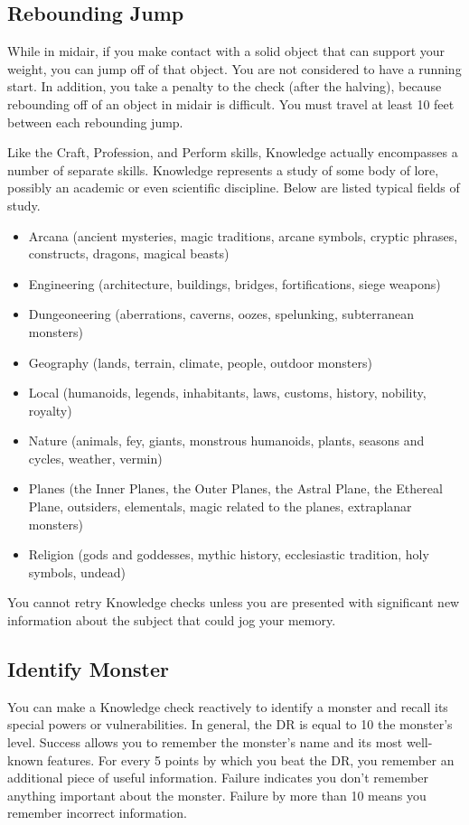     \subsection{Rebounding Jump}\label{Rebounding Jump}
        While in midair, if you make contact with a solid object that can support your weight, you can jump off of that object. You are not considered to have a running start. In addition, you take a  penalty to the check (after the halving), because rebounding off of an object in midair is difficult. You must travel at least 10 feet between each rebounding jump.

        Like the Craft, Profession, and Perform skills, Knowledge actually encompasses a number of separate skills. Knowledge represents a study of some body of lore, possibly an academic or even scientific discipline. Below are listed typical fields of study.
        \begin{itemize}
            \item Arcana (ancient mysteries, magic traditions, arcane symbols,
                cryptic phrases, constructs, dragons, magical beasts)
            \item Engineering (architecture, buildings, bridges, fortifications, siege weapons)
            \item Dungeoneering (aberrations, caverns, oozes, spelunking, subterranean monsters)
            \item Geography (lands, terrain, climate, people, outdoor monsters)
            \item Local (humanoids, legends, inhabitants, laws, customs, history, nobility, royalty)
            \item Nature (animals, fey, giants, monstrous humanoids, plants, seasons and cycles, weather, vermin)
            \item Planes (the Inner Planes, the Outer Planes, the Astral Plane,
                the Ethereal Plane, outsiders, elementals, magic related to the planes, extraplanar monsters)
            \item Religion (gods and goddesses, mythic history, ecclesiastic tradition, holy symbols, undead)
        \end{itemize}

        You cannot retry Knowledge checks unless you are presented with significant new information about the subject that could jog your memory.

    \subsection{Identify Monster}
        You can make a Knowledge check reactively to identify a monster and recall its special powers or vulnerabilities. In general, the DR is equal to 10 \add the monster's level. Success allows you to remember the monster's name and its most well-known features. For every 5 points by which you beat the DR, you remember an additional piece of useful information. Failure indicates you don't remember anything important about the monster. Failure by more than 10 means you remember incorrect information.

